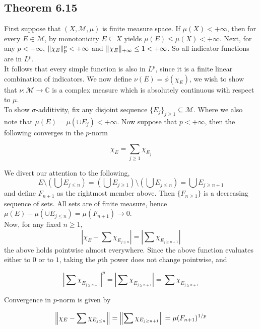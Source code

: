 \documentclass[../../main.tex]{subfiles}
\begin{document}
\subsection{Theorem 6.15}
\begin{wts}
    
\end{wts}

First suppose that $(X,\mathcal{M}, \mu)$ is finite measure space. If $\mu(X)<+\infty$, then for every $E\in\mathcal{M}$, by monotonicity $E\subseteq X$ yields $\mu(E)\leq \mu(X)<+\infty$. Next, for any $p<+\infty$, $\lVert {\chi_E} \rVert ^p_p<+\infty$ and $\lVert {\chi_E} \rVert_{+\infty}\leq 1<+\infty$. So all indicator functions are in $L^p$.\\

It follows that every simple function is also in $L^p$, since it is a finite linear combination of indicators. We now define $\nu(E) = \phi(\chi_E)$, we wish to show that $\nu:\mathcal{M}\longrightarrow \mathbb{C}$ is a complex measure which is absolutely continuous with respect to $\mu$.\\

To show $\sigma$-additivity, fix any disjoint sequence $\{E_j\}_{j\geq 1}\subseteq \mathcal{M}$. Where we also note that $\mu(E) = \mu(\cup E_j) <+\infty$. Now suppose that $p<+\infty$, then the following converges in the $p$-norm

$$
\chi_E = \sum_{j\geq 1}\chi_{E_j}
$$

We divert our attention to the following,
$$
E\setminus\left(\bigcup E_{j\leq n}\right) = \left(\bigcup E_{j\geq 1}\right)\setminus \left(\bigcup E_{j\leq n}\right) = \bigcup E_{j\geq n+1}
$$
and define $F_{n+1}$ as the rightmost member above. Then $\{F_{n\geq 1}\}$ is a decreasing sequence of sets. All sets are of finite measure, hence $\mu(E) - \mu(\cup E_{j\leq n}) = \mu(F_{n+1})\to 0$.\\ 

Now, for any fixed $n\geq 1$, 
$$
\left|\chi_E - \sum \chi_{E_{j\leq n}}\right| = \left|\sum \chi_{E_{j\geq n+1}}\right| 
$$
the above holds pointwise almost everywhere. Since the above function evaluates either to $0$ or to $1$, taking the $p$th power does not change pointwise, and 

$$
\left|\sum \chi_{E_{j\geq n+1}}\right|^p = \left|\sum \chi_{E_{j\geq n+1}}\right| = \sum \chi_{E_{j\geq n+1}}
$$

Convergence in $p$-norm is given by

$$
\left\lVert {\chi_E - \sum \chi_{E_{j\leq n}}} \right\rVert = \left\lVert {\sum \chi_{E_{j\geq n+1}}} \right\rVert = \mu(F_{n+1})^{1/p}
$$
\end{document}
